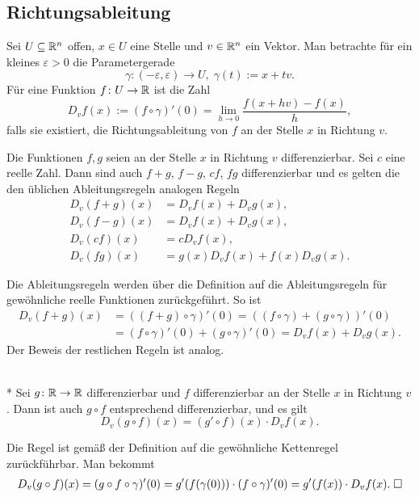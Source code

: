 \subsection{Richtungsableitung}

\begin{Definition}[Richtungsableitung]
Sei $U\subseteq\mathbb R^n$ offen, $x\in U$ eine Stelle und $v\in\mathbb R^n$
ein Vektor. Man betrachte für ein kleines $\varepsilon>0$
die Parametergerade
\[\gamma\colon(-\varepsilon,\varepsilon)\to U,\; \gamma(t):=x+tv.\]
Für eine Funktion $f\colon U\to\mathbb R$ ist die Zahl
\[D_v f(x) := (f\circ\gamma)'(0) = \lim_{h\to 0}\frac{f(x+hv)-f(x)}{h},\]
falls sie existiert, die Richtungsableitung von $f$ an der Stelle $x$ in
Richtung $v$.
\end{Definition}
\begin{Korollar}
Die Funktionen $f,g$ seien an der Stelle $x$ in Richtung $v$
differenzierbar. Sei $c$ eine reelle Zahl. Dann sind auch
$f+g$, $f-g$, $cf$, $fg$ differenzierbar und es gelten die
den üblichen Ableitungsregeln analogen Regeln
\begin{align*}
D_v(f+g)(x) &= D_v f(x)+D_v g(x),\\
D_v(f-g)(x) &= D_v f(x)+D_v g(x),\\
D_v(cf)(x) &= cD_v f(x),\\
D_v(fg)(x) &= g(x)D_v f(x) + f(x)D_v g(x).
\end{align*}
\end{Korollar}
\begin{Beweis}
Die Ableitungsregeln werden über die Definition
auf die Ableitungsregeln für gewöhnliche reelle Funktionen
zurückgeführt. So ist
\begin{align*}
D_v(f+g)(x) &= ((f+g)\circ\gamma)'(0)
= ((f\circ\gamma)+(g\circ\gamma))'(0)\\
&= (f\circ\gamma)'(0)+(g\circ\gamma)'(0)
= D_v f(x) + D_v g(x).
\end{align*}
Der Beweis der restlichen Regeln ist analog.\,\qedsymbol
\end{Beweis}

\begin{Korollar}[Kettenregel]\mbox{}\\*
Sei $g\colon\mathbb R\to\mathbb R$ differenzierbar und
$f$ differenzierbar an der Stelle $x$ in Richtung $v$. Dann ist
auch $g\circ f$ entsprechend differenzierbar, und es gilt
\[D_v(g\circ f)(x) = (g'\circ f)(x)\cdot D_v f(x).\]
\end{Korollar}
\begin{Beweis}
Die Regel ist gemäß der Definition auf die gewöhnliche Kettenregel
zurückführbar. Man bekommt
\begin{align*}
D_v(g\circ f)(x) = (g\circ f\circ\gamma)'(0)
= g'(f(\gamma(0)))\cdot (f\circ\gamma)'(0)
= g'(f(x))\cdot D_v f(x).\;\square
\end{align*}
\end{Beweis}

